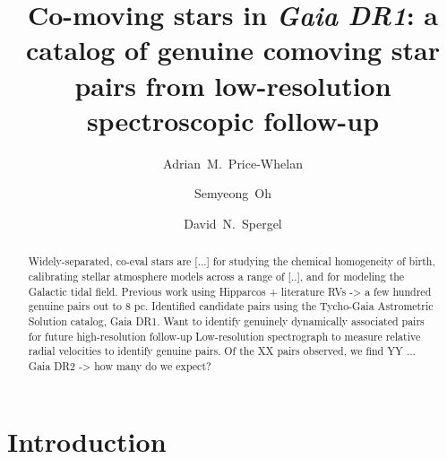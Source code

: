 \documentclass[modern, letterpaper]{aastex61}
\begin{document}
\sloppy\sloppypar\raggedbottom\frenchspacing %

\title{Co-moving stars in \textsl{Gaia DR1}:
       a catalog of genuine comoving star pairs from low-resolution
       spectroscopic follow-up}

\author{Adrian~M.~Price-Whelan}

\author{Semyeong~Oh}

\author{David~N.~Spergel}




\begin{abstract}
Widely-separated, co-eval stars are [...] for studying the chemical homogeneity
of birth, calibrating stellar atmosphere models across a range of [..], and for
modeling the Galactic tidal field.
Previous work using Hipparcos + literature RVs -> a few hundred genuine pairs
out to 8 pc.
Identified candidate pairs using the Tycho-Gaia Astrometric Solution catalog,
Gaia DR1.
Want to identify genuinely dynamically associated pairs for future
high-resolution follow-up
Low-resolution spectrograph to measure relative radial velocities to identify
genuine pairs.
Of the XX pairs observed, we find YY ...
Gaia DR2 -> how many do we expect?
\end{abstract}


\section{Introduction}\label{sec:introduction}
\end{document}
